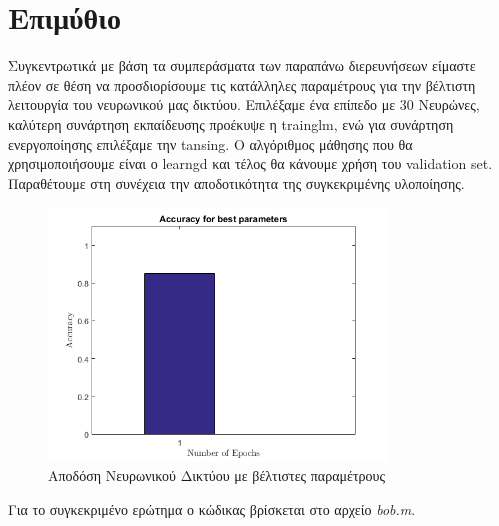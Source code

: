 \documentclass[12pt]{article}
\begin{document}
\section*{Επιμύθιο }
Συγκεντρωτικά με βάση τα συμπεράσματα των παραπάνω διερευνήσεων είμαστε πλέον σε θέση να προσδιορίσουμε τις κατάλληλες παραμέτρους για την βέλτιστη λειτουργία του νευρωνικού μας δικτύου. Επιλέξαμε ένα επίπεδο με 30 Νευρώνες, καλύτερη συνάρτηση εκπαίδευσης προέκυψε η trainglm, ενώ για συνάρτηση ενεργοποίησης επιλέξαμε την tansing. Ο αλγόριθμος μάθησης που θα χρησιμοποιήσουμε είναι ο learngd και τέλος θα κάνουμε χρήση του validation set. Παραθέτουμε στη συνέχεια την αποδοτικότητα της συγκεκριμένης υλοποίησης.
\begin{figure}[H]
	 		\centering
			\includegraphics[width=0.8\textwidth]{fakelos/step7.png}
			\caption{Αποδόση Νευρωνικού Δικτύου με βέλτιστες παραμέτρους}
			\label{fig:4.Learn-algo}
		\end{figure}

Για το συγκεκριμένο ερώτημα ο κώδικας βρίσκεται στο αρχείο \textit{bob.m}. 
				
\end{document}
